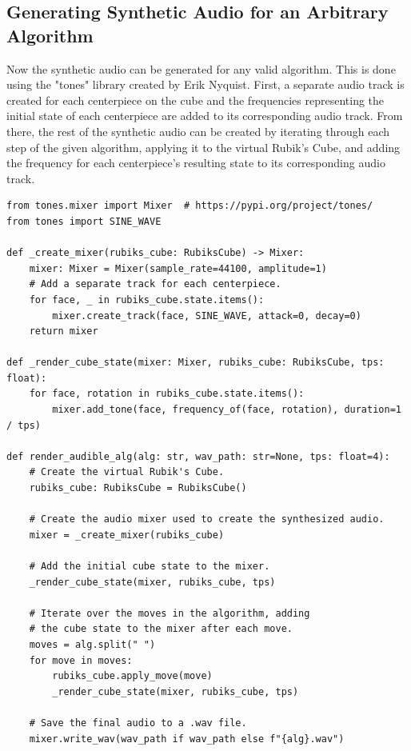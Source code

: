 \subsection{Generating Synthetic Audio for an Arbitrary Algorithm}
\label{subsec:generate-audible-algorithm}
Now the synthetic audio can be generated for any valid algorithm.
This is done using the "tones" library \cite{pip-tones} created by Erik Nyquist.
First, a separate audio track is created for each centerpiece on the cube and the frequencies representing the initial state of each centerpiece are added to its corresponding audio track.
From there, the rest of the synthetic audio can be created by iterating through each step of the given algorithm, applying it to the virtual Rubik's Cube, and adding the frequency for each centerpiece's resulting state to its corresponding audio track.

\begin{verbatim}
from tones.mixer import Mixer  # https://pypi.org/project/tones/
from tones import SINE_WAVE
    
def _create_mixer(rubiks_cube: RubiksCube) -> Mixer:
    mixer: Mixer = Mixer(sample_rate=44100, amplitude=1)
    # Add a separate track for each centerpiece.
    for face, _ in rubiks_cube.state.items():
        mixer.create_track(face, SINE_WAVE, attack=0, decay=0)
    return mixer

def _render_cube_state(mixer: Mixer, rubiks_cube: RubiksCube, tps: float):
    for face, rotation in rubiks_cube.state.items():
        mixer.add_tone(face, frequency_of(face, rotation), duration=1 / tps)

def render_audible_alg(alg: str, wav_path: str=None, tps: float=4):
    # Create the virtual Rubik's Cube.
    rubiks_cube: RubiksCube = RubiksCube()
    
    # Create the audio mixer used to create the synthesized audio.
    mixer = _create_mixer(rubiks_cube)
    
    # Add the initial cube state to the mixer.
    _render_cube_state(mixer, rubiks_cube, tps)
    
    # Iterate over the moves in the algorithm, adding
    # the cube state to the mixer after each move.
    moves = alg.split(" ")
    for move in moves:
        rubiks_cube.apply_move(move)
        _render_cube_state(mixer, rubiks_cube, tps)
    
    # Save the final audio to a .wav file.
    mixer.write_wav(wav_path if wav_path else f"{alg}.wav")
\end{verbatim}

